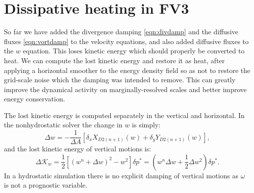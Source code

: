 \documentclass[10pt,letterpaper,margin=1in]{memoir}
\begin{document}
\section{Dissipative heating in FV3} \label{sec:dissiphtg}

So far we have added the divergence damping \eqref{eqn:divdamp} and the diffusive fluxes \eqref{eqn:vortdamp} to the velocity equations, and also added diffusive fluxes to the $w$ equation. This loses kinetic energy which should properly be converted to heat. We can compute the lost kinetic energy and restore it as heat, after applying a horizontal smoother to the energy density field so as not to restore the grid-scale noise which the damping was intended to remove.
This can greatly improve the dynamical activity on marginally-resolved scales and better improve energy conservation.

The lost kinetic energy is computed separately in the vertical and horizontal. In the nonhydrostatic solver the change in $w$ is simply:
\begin{equation}
\Delta w = - \frac{1}{\Delta A} \left [ \delta_x X_{D2(n+1)}(w) + \delta_y Y_{D2(n+1)}(w)  \right ],
\end{equation}
and the lost kinetic energy of vertical motions is:
\begin{equation}
\Delta \mathcal{K}_w = \frac{1}{2} \left [ \left ( w^n + \Delta w \right )^2 - w^2 \right ] \delta p^* = \left ( w^n\Delta w + \frac{1}{2}\Delta w^2 \right ) \delta p^*.
\end{equation}
In a hydrostatic simulation there is no explicit damping of vertical motions as $\omega$ is not a prognostic variable. 
\end{document}
